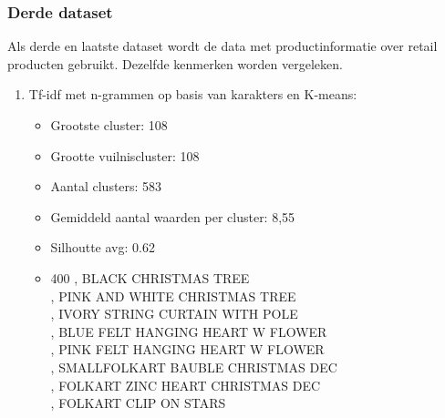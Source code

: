 \newpage


\subsubsection{Derde dataset}
Als derde en laatste dataset wordt de data met productinformatie over retail producten gebruikt. Dezelfde kenmerken worden vergeleken.
\\\indent

\begin{enumerate}
    \item Tf-idf met n-grammen op basis van karakters en K-means:
    \begin{itemize}
        \item Grootste cluster: 108
        \item Grootte vuilniscluster: 108
        \item Aantal clusters: 583
        \item Gemiddeld aantal waarden per cluster: 8,55
        \item Silhoutte avg: 0.62
        \item 400 , BLACK CHRISTMAS TREE
        \\ , PINK AND WHITE CHRISTMAS TREE
        \\ , IVORY STRING CURTAIN WITH POLE
        \\ , BLUE FELT HANGING HEART W FLOWER
        \\ , PINK FELT HANGING HEART W FLOWER
        \\ , SMALLFOLKART BAUBLE CHRISTMAS DEC
        \\ , FOLKART ZINC HEART CHRISTMAS DEC
        \\ , FOLKART CLIP ON STARS


\end{itemize}
\end{enumerate}

